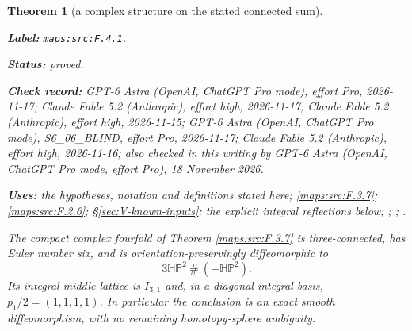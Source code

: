 \documentclass[11pt,a4paper]{article}
\newtheorem{theorem}{Theorem}[section]
\theoremstyle{definition}
\newcommand{\StatementRecord}[4]{\par\smallskip\begingroup\upshape\raggedright\noindent\textbf{Label:} \nolinkurl{#1}.\par\noindent\textbf{Status:} #2.\par\noindent\textbf{Check record:} #3.\par\noindent\textbf{Uses:} #4.\par\endgroup\smallskip}
\newcommand{\CurrentChecker}{GPT-6 Astra (OpenAI, ChatGPT Pro mode, effort Pro), 18 November 2026}
\begin{document}
\begin{theorem}[a complex structure on the stated connected sum]\label{maps:src:F.4.1}
\StatementRecord{maps:src:F.4.1}{proved}{GPT-6 Astra (OpenAI, ChatGPT Pro mode), effort Pro, 2026-11-17; Claude Fable 5.2 (Anthropic), effort high, 2026-11-17; Claude Fable 5.2 (Anthropic), effort high, 2026-11-15; GPT-6 Astra (OpenAI, ChatGPT Pro mode), S6\_06\_BLIND, effort Pro, 2026-11-17; Claude Fable 5.2 (Anthropic), effort high, 2026-11-16; also checked in this writing by \CurrentChecker}{the hypotheses, notation and definitions stated here; \cref{maps:src:F.3.7}; \cref{maps:src:F.2.6}; \S\ref{sec:V-known-inputs}; the explicit integral reflections below; \cite[Corollary 1.4, p.~4]{ffMandal}; \cite[Definition 3.6 and Theorem 3.7(1), pp.~12--14]{IVVWallForm}; \cite[Theorem A, p.~178]{IVVKramerStolz}}


The compact complex fourfold of Theorem \ref{maps:src:F.3.7} is three-connected,
has Euler number six, and is orientation-preservingly diffeomorphic to
\[
 3\mathbb H\mathbb P^2\ \#\ (-\mathbb H\mathbb P^2).
 \tag{F.25}\label{maps:eq:F.25}
\]
Its integral middle lattice is $I_{3,1}$ and, in a diagonal integral
basis, $p_1/2=(1,1,1,1)$.  In particular the conclusion is an exact
smooth diffeomorphism, with no remaining homotopy-sphere ambiguity.

\end{theorem}
\end{document}
